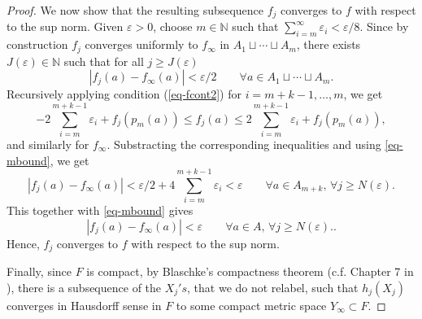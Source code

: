 \documentclass[a4paper,12pt,reqno]{amsart}
\theoremstyle{plain}
\newcommand{\be}{\begin{equation}}
\newcommand{\ee}{\end{equation}}
\newcommand{\disjointunion}{\sqcup}
\begin{document}
\begin{proof}
\medskip
We now show that the resulting subsequence $f_j$ converges to $f$ with respect to the sup norm.
Given $\varepsilon>0$, choose $m \in \mathbb N$ such that $\sum_{i=m}^\infty \varepsilon_i < \varepsilon/8$. Since by construction $f_j$ converges uniformly to $f_\infty$ in $
A_1 \disjointunion \cdots \disjointunion A_{m}$, there exists $J(\varepsilon) \in \mathbb N$ such that for all $j \geq J(\varepsilon)$
\begin{equation}\label{eq-mbound}
    |f_j(a)- f_\infty(a)| < \varepsilon/2 \qquad \forall a \in A_1 \disjointunion \cdots \disjointunion A_{m}. 
\end{equation}
Recursively applying condition (\ref{eq-fcont2}) for $i=m+k-1,\ldots,m$, we get 
\be
-2\sum_{i=m}^{m+k-1}\varepsilon_i + f_j(p_m(a)) \leq f_j(a) \leq  2\sum_{i=m}^{m+k-1}\varepsilon_i+ f_j(p_m(a)),
\ee
and similarly for $f_\infty$. 
Substracting the corresponding inequalities and using \eqref{eq-mbound}, we get  
\be
|f_j(a)- f_\infty(a)| < \varepsilon/2 + 4 \sum_{i=m}^{m+k-1} \varepsilon_i < \varepsilon \qquad \forall a \in A_{m+k},\,\forall j \geq N(\varepsilon). 
\ee
This together with \eqref{eq-mbound} gives 
\be
|f_j(a)- f_\infty(a)| < \varepsilon \qquad \forall a \in A, \,\forall j \geq N(\varepsilon).. 
\ee
Hence, $f_j$ converges to $f$ with respect to the sup norm.
 

\medskip 
Finally, since $F$ is compact, 
by Blaschke's compactness theorem (c.f. Chapter 7 in \cite{BBI}),
there is a subsequence of the $X_j's$, that we do not relabel,
such that $h_j(X_j)$ converges in Hausdorff sense in $F$ to some compact metric space $Y_\infty \subset F$.
\end{proof}




\end{document}
